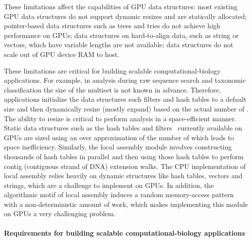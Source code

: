 These limitations affect the capabilities of GPU data structures: most existing GPU data structures do not support dynamic resizes and are statically allocated; pointer-based data structures such as trees and tries do not achieve high performance on GPUs; data structures on hard-to-align data, such as string or vectors, which have variable lengths are not available; data structures do not scale out of GPU device RAM to host.

These limitations are critical for building scalable computational-biology applications. For example, in \kmer analysis during raw sequence search and taxonomic classification the size of the \kmer multiset is not known in advance. Therefore, applications initialize the data structures such filters and hash tables to a default size and then dynamically resize (mostly expand) based on the actual number of \kmers. The ability to resize is critical to perform \kmer analysis in a space-efficient manner. Static data structures such as the hash tables and filters~\cite{GeilFO18} currently available on GPUs are sized using an over approximation of the number of \kmers which leads to space inefficiency.
Similarly, the local assembly module involves constructing thousands of hash tables in parallel and then using those hash tables to perform contig (contiguous strand of DNA) extension walks. The CPU implementation of local assembly relies heavily on dynamic
structures like hash tables, vectors and strings, which are a challenge to implement on GPUs. In addition, the algorithmic motif of local assembly induces a random memory-access pattern with a non-deterministic amount of work, which makes implementing this module on GPUs a very challenging problem.






\paragraph{Requirements for building scalable computational-biology applications}

